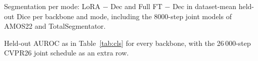 \begin{table}[htbp]
\centering
\caption{Segmentation per mode: LoRA $-$ Dec and Full FT $-$ Dec in dataset-mean held-out Dice per backbone and mode, including the 8000-step joint models of AMOS22 and TotalSegmentator.}
\label{tab:segmodes}
\end{table}

\begin{table}[htbp]
\centering
\caption{Held-out AUROC as in Table~\ref{tab:cls} for every backbone, with the 26\,000-step CVPR26 joint schedule as an extra row.}
\label{tab:clsladder}
\end{table}


